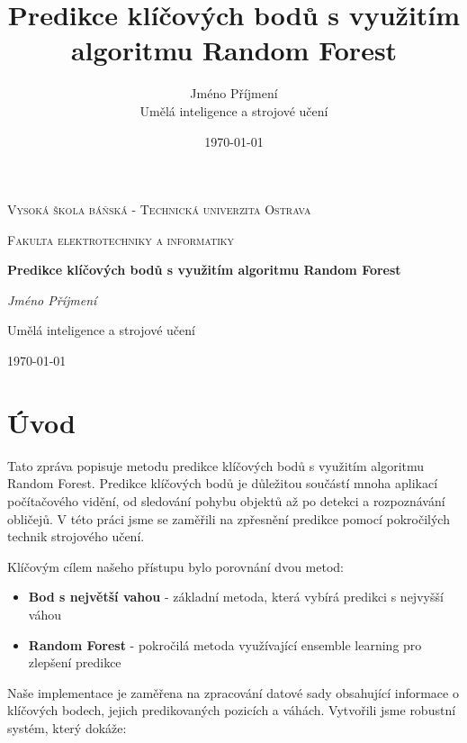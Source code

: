 \documentclass[a4paper,12pt]{article}
\title{Predikce klíčových bodů s využitím algoritmu Random Forest}
\author{Jméno Příjmení\\Umělá inteligence a strojové učení}
\date{\today}
\begin{document}
\begin{titlepage}
    \centering
    \vspace*{1cm}
    {\scshape\LARGE Vysoká škola báňská - Technická univerzita Ostrava \par}
    \vspace{1cm}
    {\scshape\Large Fakulta elektrotechniky a informatiky\par}
    \vspace{1.5cm}
    {\huge\bfseries Predikce klíčových bodů s využitím algoritmu Random Forest\par}
    \vspace{2cm}
    {\Large\itshape Jméno Příjmení\par}
    \vspace{1cm}
    {\large Umělá inteligence a strojové učení\par}
    \vfill
    
    
    {\large \today\par}
\end{titlepage}

\tableofcontents
\newpage

\section{Úvod}
\label{sec:introduction}

Tato zpráva popisuje metodu predikce klíčových bodů s využitím algoritmu Random Forest. Predikce klíčových bodů je důležitou součástí mnoha aplikací počítačového vidění, od sledování pohybu objektů až po detekci a rozpoznávání obličejů. V této práci jsme se zaměřili na zpřesnění predikce pomocí pokročilých technik strojového učení.

Klíčovým cílem našeho přístupu bylo porovnání dvou metod:
\begin{itemize}
    \item \textbf{Bod s největší vahou} - základní metoda, která vybírá predikci s nejvyšší váhou
    \item \textbf{Random Forest} - pokročilá metoda využívající ensemble learning pro zlepšení predikce
\end{itemize}

Naše implementace je zaměřena na zpracování datové sady obsahující informace o klíčových bodech, jejich predikovaných pozicích a váhách. Vytvořili jsme robustní systém, který dokáže:
\end{document}
